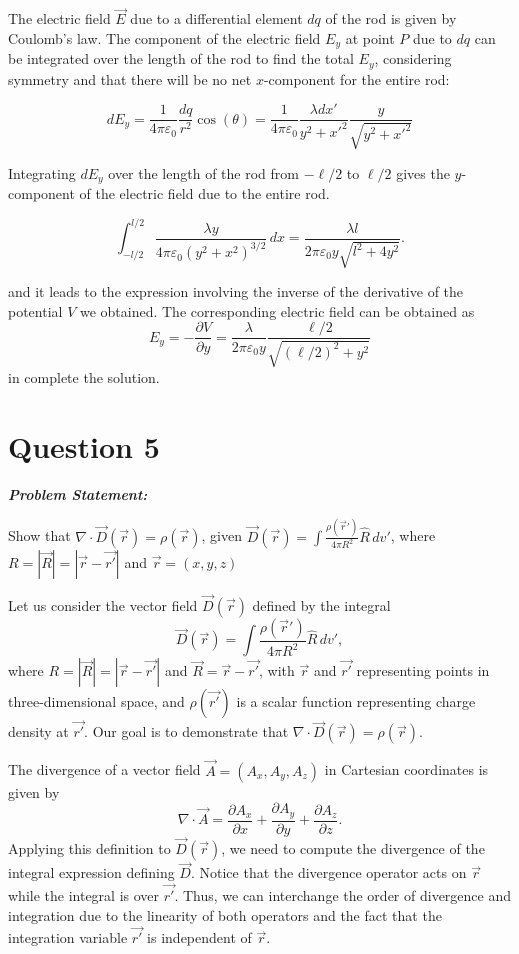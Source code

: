 \documentclass[12pt]{article}
\newenvironment{q}
{
    \begin{qframe}
    \noindent\textit{\textbf{Problem Statement:}}
    \par\smallskip
}
{
    \end{qframe}
}
\begin{document}
The electric field \(\vec{E}\) due to a differential element \(dq\) of the rod is given by Coulomb's law. The component of the electric field \(E_y\) at point \(P\) due to \(dq\) can be integrated over the length of the rod to find the total \(E_y\), considering symmetry and that there will be no net \(x\)-component for the entire rod:

\[
dE_y = \frac{1}{4\pi\varepsilon_0} \frac{dq}{r^2} \cos(\theta) = \frac{1}{4\pi\varepsilon_0} \frac{\lambda dx'}{y^2+x'^2} \frac{y}{\sqrt{y^2+x'^2}}
\]

Integrating \(dE_y\) over the length of the rod from \(-\ell/2\) to \(\ell/2\) gives the \(y\)-component of the electric field due to the entire rod.

\[\int_{-l/2}^{l/2} \frac{\lambda y}{4\pi \varepsilon_0 (y^2 + x^2)^{3/2}} \, dx=\frac{\lambda l}{2 \pi \varepsilon_0 y \sqrt{l^2 + 4y^2}}.\]

and it leads to the expression involving the inverse of the derivative of the potential \(V\) we obtained. The corresponding electric field can be obtained as
\[
E_y=-\frac{\partial V}{\partial y}=\frac{\lambda}{2 \pi \varepsilon_0 y} \frac{\ell / 2}{\sqrt{(\ell / 2)^2+y^2}}
\]
in complete the solution. 


\newpage
\section*{Question 5}

\begin{q}
Show that \(\nabla \cdot \vec{D}(\vec{r}) = \rho(\vec{r})\), given \(\vec{D}(\vec{r}) = \int \frac{\rho(\vec{r}')}{4 \pi R^2} \hat{R} \, dv'\), where \(R = |\vec{R}| = |\vec{r} - \vec{r'}|\) and \(\vec{r} = (x,y,z)\)
\end{q}


Let us consider the vector field \(\vec{D}(\vec{r})\) defined by the integral
\[
\vec{D}(\vec{r}) = \int \frac{\rho(\vec{r}')}{4 \pi R^2} \hat{R} \, dv',
\]
where \(R = |\vec{R}| = |\vec{r} - \vec{r'}|\) and \(\vec{R} = \vec{r} - \vec{r'}\), with \(\vec{r}\) and \(\vec{r'}\) representing points in three-dimensional space, and \(\rho(\vec{r'})\) is a scalar function representing charge density at \(\vec{r'}\). Our goal is to demonstrate that \(\nabla \cdot \vec{D}(\vec{r}) = \rho(\vec{r})\).

The divergence of a vector field \(\vec{A} = (A_x, A_y, A_z)\) in Cartesian coordinates is given by
\[
\nabla \cdot \vec{A} = \frac{\partial A_x}{\partial x} + \frac{\partial A_y}{\partial y} + \frac{\partial A_z}{\partial z}.
\]
Applying this definition to \(\vec{D}(\vec{r})\), we need to compute the divergence of the integral expression defining \(\vec{D}\). Notice that the divergence operator acts on \(\vec{r}\) while the integral is over \(\vec{r'}\). Thus, we can interchange the order of divergence and integration due to the linearity of both operators and the fact that the integration variable \(\vec{r'}\) is independent of \(\vec{r}\).
\end{document}
